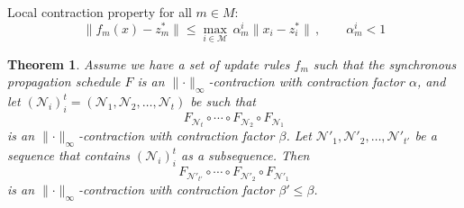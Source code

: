 \documentclass[11pt,a4paper]{article}
\newtheorem{theorem}{Theorem}
\theoremstyle{remark}
\newcommand{\M}{\mathcal{M}}
\newcommand{\N}{\mathcal{N}}
\newcommand{\norm}[1]{\lVert #1 \rVert}
\begin{document}
Local contraction property for all $m \in M$:
\[ \norm{f_m(x) - z_m^* } \le \max_{i \in \M} \, \alpha^i_m \norm{ x_i - z_i^* }\,,\qquad \alpha^i_m < 1  \]


\begin{theorem}
Assume we have a set of update rules $f_m$ such that the synchronous propagation schedule $F$ is an $\norm{\cdot}_\infty$-contraction with contraction factor $\alpha$, and let $(\N_i)_i^t = (\N_1, \N_2, \dotsc, \N_t)$ be such that
\[ F_{\N_{t}} \circ \dotsb \circ F_{\N_{2}} \circ F_{\N_{1}} \]
is an $\norm{\cdot}_\infty$-contraction with contraction factor $\beta$. Let $\N'_1, \N'_2, \dotsc, \N'_{t'}$ be a sequence that contains $(\N_i)_i^t$ as a subsequence. Then 
\[ F_{\N'_{t'}} \circ \dotsb \circ F_{\N'_{2}} \circ F_{\N'_{1}} \]
is an $\norm{\cdot}_\infty$-contraction with contraction factor $\beta' \le \beta$.
\end{theorem}




\end{document}
